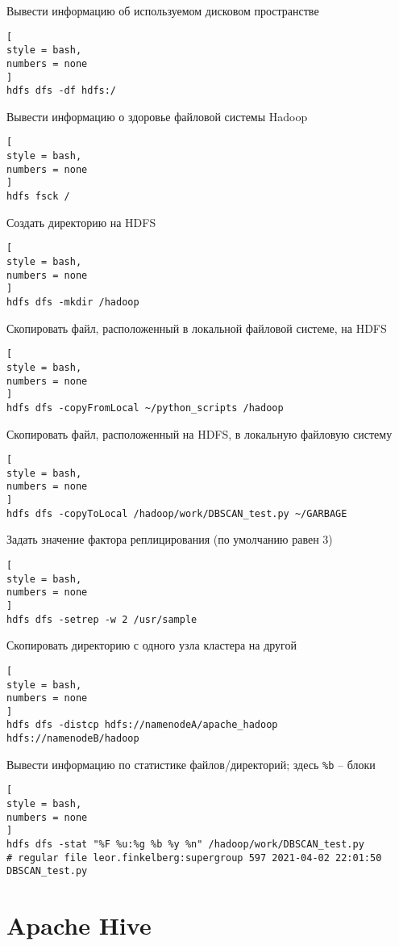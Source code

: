 \documentclass[%
	11pt,
	a4paper,
	utf8,
		]{article}
\begin{document}
Вывести информацию об используемом дисковом пространстве
\begin{lstlisting}[
style = bash,
numbers = none	
]
hdfs dfs -df hdfs:/
\end{lstlisting}

Вывести информацию о здоровье файловой системы Hadoop
\begin{lstlisting}[
style = bash,
numbers = none	
]
hdfs fsck /
\end{lstlisting}

Создать директорию на HDFS
\begin{lstlisting}[
style = bash,
numbers = none	
]
hdfs dfs -mkdir /hadoop
\end{lstlisting}

Скопировать файл, расположенный в локальной файловой системе, на HDFS
\begin{lstlisting}[
style = bash,
numbers = none	
]
hdfs dfs -copyFromLocal ~/python_scripts /hadoop
\end{lstlisting}

Скопировать файл, расположенный на HDFS, в локальную файловую систему
\begin{lstlisting}[
style = bash,
numbers = none	
]
hdfs dfs -copyToLocal /hadoop/work/DBSCAN_test.py ~/GARBAGE
\end{lstlisting}

Задать значение фактора реплицирования (по умолчанию равен 3)
\begin{lstlisting}[
style = bash,
numbers = none	
]
hdfs dfs -setrep -w 2 /usr/sample
\end{lstlisting}

Скопировать директорию с одного узла кластера на другой
\begin{lstlisting}[
style = bash,
numbers = none	
]
hdfs dfs -distcp hdfs://namenodeA/apache_hadoop hdfs://namenodeB/hadoop
\end{lstlisting}

Вывести информацию по статистике файлов/директорий; здесь \verb|%b| -- блоки
\begin{lstlisting}[
style = bash,
numbers = none	
]
hdfs dfs -stat "%F %u:%g %b %y %n" /hadoop/work/DBSCAN_test.py
# regular file leor.finkelberg:supergroup 597 2021-04-02 22:01:50 DBSCAN_test.py
\end{lstlisting}


\section{Apache Hive}
\end{document}
